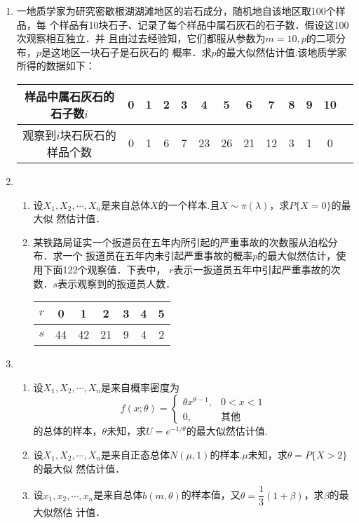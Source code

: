\documentclass[10pt,a4paper]{article}
\begin{document}
\begin{enumerate}
    \item 一地质学家为研究密歇根湖湖滩地区的岩石成分，随机地自该地区取100个样品，每
    个样品有10块石子、记录了每个样品中属石灰石的石子数．假设这100次观察相互独立．并
    且由过去经验知，它们都服从参数为$m=10,p$的二项分布，$p$是这地区一块石子是石灰石的
    概率．求$p$的最大似然估计值.该地质学家所得的数据如下：
    \renewcommand{\arraystretch}{1.3}
    \begin{table}[H]\centering
        \begin{tabular}{c|cccccccccccc}
        样品中属石灰石的石子数$i$   & 0   & 1  & 2 & 3 & 4 & 5 & 6 & 7 & 8 & 9 & 10 \\ \hline
        观察到$i$块石灰石的样品个数 & 0 & 1 & 6 & 7 & 23 & 26 & 21 & 12 & 3 & 1 & 0 
        \end{tabular}
    \end{table}
    \renewcommand{\arraystretch}{1.0}




    \item \begin{enumerate}
        \item 设$X_1,X_2,\cdots,X_n$是来自总体$X$的一个样本.且$X\sim \pi(\lambda)$，求$P\{X=0\}$的最大似
        然估计值．
        \item 某铁路局证实一个扳道员在五年内所引起的严重事故的次数服从泊松分布．求一个
        扳道员在五年内未引起严重事故的概率$p$的最大似然估计，使用下面122个观察值．下表中，
        $r$表示一扳道员五年中引起严重事故的次数．$s$表示观察到的扳道员人数．
        \renewcommand{\arraystretch}{1.3}
        \begin{table}[H]\centering
            \begin{tabular}{c|cccccc}
            $r$ & 0 & 1 & 2 & 3 & 4 & 5   \\ \hline
            $s$ & 44 & 42 & 21 & 9 & 4 & 2
            \end{tabular}
        \end{table}
        \renewcommand{\arraystretch}{1.0}
    \end{enumerate}
    



    \item \begin{enumerate}
        \item 设$X_1,X_2,\cdots,X_n$是来自概率密度为
        $$f(x;\theta)=\left\{\begin{array}{ll}
            \theta x^{\theta-1}, & 0<x<1\\
            0, & \mbox{其他}
        \end{array}\right.$$
        的总体的样本，$\theta$未知，求$U=e^{-1/\theta}$的最大似然估计值.
        \item 设$X_1,X_2,\cdots,X_n$是来自正态总体$N(\mu,1)$的样本.$\mu$未知，求$\theta=P\{X>2\}$的最大似
        然估计值．
        \item 设$x_1,x_2,\cdots,x_n$是来自总体$b(m,\theta)$的样本值，又$\theta=\dfrac{1}{3}(1+\beta)$，求$\beta$的最大似然估
        计值．
    \end{enumerate}
    





\end{enumerate}
\end{document}
